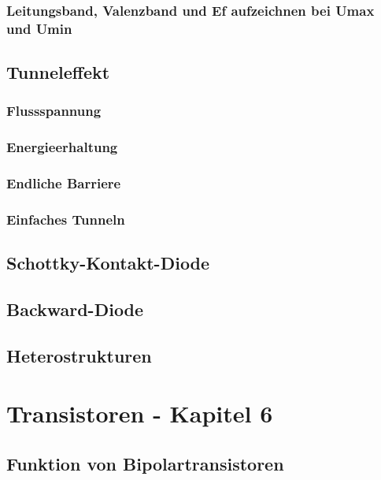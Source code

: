 \documentclass{article}
\begin{document}
    \subsubsection{Leitungsband, Valenzband und Ef aufzeichnen bei Umax und Umin}
	
\subsection{Tunneleffekt}\label{k5:tunnelEffekt}
    \subsubsection{Flussspannung}
    \subsubsection{Energieerhaltung}
    \subsubsection{Endliche Barriere}
    \subsubsection{Einfaches Tunneln}

\subsection{Schottky-Kontakt-Diode}\label{k5:schottky}

\subsection{Backward-Diode}\label{k5:backward}

\subsection{Heterostrukturen}\label{k5:heterostrukturen}


\section{Transistoren - Kapitel 6}
\subsection{Funktion von Bipolartransistoren}\label{k6:bipolar}
\end{document}
